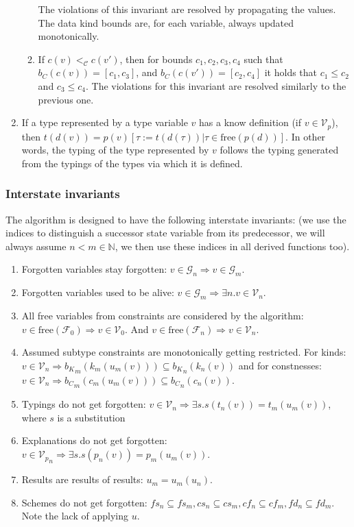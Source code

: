 \begin{enumerate}
\begin{enumerate}
            The violations of this invariant are resolved by propagating the values. The data kind bounds are, for each variable, always updated monotonically.
            \item If $c (v) <_{\mathcal{C}} c (v')$, then for bounds $c_1, c_2, c_3, c_4$ such that $b_C (c (v)) = [c_1, c_3]$, and $b_C (c (v')) = [c_2, c_4]$ it holds that $c_1 \leq c_2$ and $c_3 \leq c_4$. The violations for this invariant are resolved similarly to the previous one.
        \end{enumerate}


    \item If a type represented by a type variable $v$ has a know definition (if $v \in \mathcal{V}_p$), then $t (d (v)) = p(v) \left[ \tau := t (d (\tau)) | \tau \in \mathrm{free} (p (d))\right]$. In other words, the typing of the type represented by $v$ follows the typing generated from the typings of the types via which it is defined. \label{invT}
\end{enumerate}

\subsubsection{Interstate invariants}

The algorithm is designed to have the following interstate invariants: (we use the indices to distinguish a successor state variable from its predecessor, we will always assume $n < m \in \mathbb{N}$, we then use these indices in all derived functions too).

\begin{enumerate}
    \item Forgotten variables stay forgotten: $v \in \mathcal{G}_n \Rightarrow v \in \mathcal{G}_m$.
    \item Forgotten variables used to be alive: $v \in \mathcal{G}_m \Rightarrow \exists n . v \in \mathcal{V}_n$.
    \item All free variables from constraints are considered by the algorithm: $v \in \mathrm{free} (\mathcal{F}_0) \Rightarrow v \in \mathcal{V}_0$. And $v \in \mathrm{free} (\mathcal{F}_n) \Rightarrow v \in \mathcal{V}_n$.
    \item Assumed subtype constraints are monotonically getting restricted. For kinds: $v \in {\mathcal{V}}_n \Rightarrow {b_K}_m (k_m(u_m(v))) \subseteq {b_K}_n (k_n(v))$ and for constnesses: $v \in {\mathcal{V}}_n \Rightarrow {b_C}_m (c_m(u_m(v))) \subseteq {b_C}_n (c_n(v))$.
    \item Typings do not get forgotten: $v \in {\mathcal{V}}_n \Rightarrow \exists s . s(t_n(v)) = t_m(u_m (v))$, where $s$ is a substitution
    \item Explanations do not get forgotten: $v \in {\mathcal{V}_p}_n \Rightarrow \exists s . s(p_n(v)) = p_m(u_m (v))$.
    \item Results are results of results: $u_m = u_m (u_n)$.
    \item Schemes do not get forgotten: $fs_n \subseteq fs_m, cs_n \subseteq cs_m, cf_n \subseteq  cf_m, fd_n \subseteq  fd_m$. Note the lack of applying $u$.
\end{enumerate}

